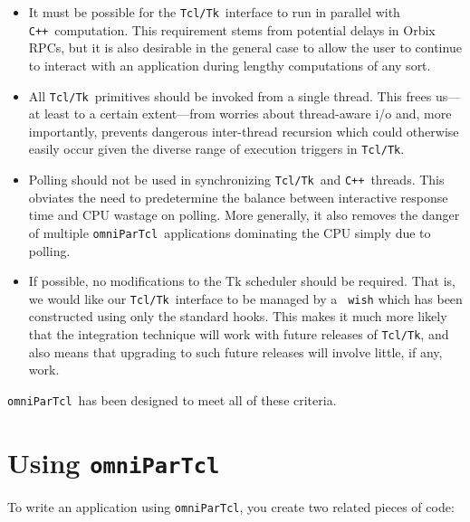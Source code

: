 \documentclass[11pt]{article}
\def\omniParTcl{{\tt omniParTcl}}
\def\tcltk{{\tt Tcl/Tk}}
\def\CXX{{\tt C++}}
\begin{document}
\begin{itemize}

\item 
It must be possible for the \tcltk\ interface to run in parallel with
\CXX\ computation.  This requirement stems from potential delays in
Orbix RPCs, but it is also desirable in the general case to allow
the user to continue to interact with an application during
lengthy computations of any sort.

\item
All \tcltk\ primitives should be invoked from a single thread.  This
frees us---at least to a certain extent---from worries about
thread-aware i/o and, more importantly, prevents dangerous inter-thread
recursion which could otherwise easily occur given the diverse range of
execution triggers in \tcltk.

\item
Polling should not be used in synchronizing \tcltk\ and \CXX\ 
threads.  This obviates the need to predetermine the balance between
interactive response time and CPU wastage on polling.  More generally,
it also removes the danger of multiple \omniParTcl\ applications
dominating the CPU simply due to polling.

\item 
If possible, no modifications to the Tk scheduler should be required.
That is, we would like our \tcltk\ interface to be managed by a {\tt
wish} which has been constructed using only the standard
hooks.  This makes it much more likely that the integration technique
will work with future releases of \tcltk, and also means that upgrading
to such future releases will involve little, if any, work.

\end{itemize}

\noindent
\omniParTcl\ has been designed to meet all of these criteria.

\section{Using \omniParTcl}

To write an application using \omniParTcl, you create two related pieces
of code:
\end{document}
